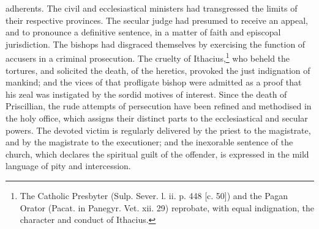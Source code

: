 adherents. The civil and ecclesiastical ministers had transgressed the limits of their respective provinces. The secular judge had presumed to receive an appeal, and to pronounce a definitive sentence, in a matter of faith and episcopal jurisdiction. The bishops had disgraced themselves by exercising the function of accusers in a criminal prosecution. The cruelty of Ithacius,\footnote{The Catholic Presbyter (Sulp. Sever. l. ii. p. 448 [c. 50]) and the Pagan Orator (Pacat. in Panegyr. Vet. xii. 29) reprobate, with equal indignation, the character and conduct of Ithacius.} who beheld the tortures, and solicited the death, of the heretics, provoked the just indignation of mankind; and the vices of that profligate bishop were admitted as a proof that his zeal was instigated by the sordid motives of interest. Since the death of Priscillian, the rude attempts of persecution have been refined and methodised in the holy office, which assigns their distinct parts to the ecclesiastical and secular powers. The devoted victim is regularly delivered by the priest to the magistrate, and by the magistrate to the executioner; and the inexorable sentence of the church, which declares the spiritual guilt of the offender, is expressed in the mild language of pity and intercession.

